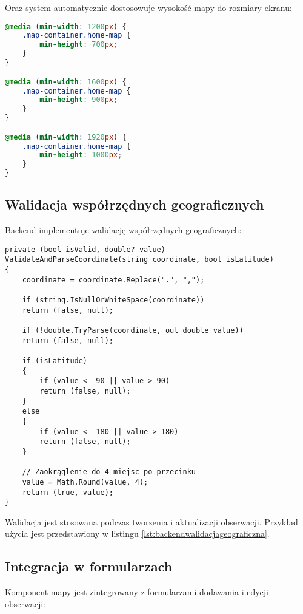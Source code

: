 Oraz system automatycznie dostosowuje wysokość mapy do rozmiary ekranu:

\begin{lstlisting}[language=CSS, caption={Styl CSS mapy do wysokości}]
@media (min-width: 1200px) {
	.map-container.home-map {
		min-height: 700px;
	}
}

@media (min-width: 1600px) {
	.map-container.home-map {
		min-height: 900px;
	}
}

@media (min-width: 1920px) {
	.map-container.home-map {
		min-height: 1000px;
	}
}
\end{lstlisting}

\subsection{Walidacja współrzędnych geograficznych}
Backend implementuje walidację współrzędnych geograficznych:

\begin{lstlisting}[style=csharp, caption={Kod odpowiedzialny za walidacje współrzędnych}]
private (bool isValid, double? value) ValidateAndParseCoordinate(string coordinate, bool isLatitude)
{
	coordinate = coordinate.Replace(".", ",");
	
	if (string.IsNullOrWhiteSpace(coordinate))
	return (false, null);
	
	if (!double.TryParse(coordinate, out double value))
	return (false, null);
	
	if (isLatitude)
	{
		if (value < -90 || value > 90)
		return (false, null);
	}
	else
	{
		if (value < -180 || value > 180)
		return (false, null);
	}
	
	// Zaokrąglenie do 4 miejsc po przecinku
	value = Math.Round(value, 4);
	return (true, value);
}
\end{lstlisting}

Walidacja jest stosowana podczas tworzenia i aktualizacji obserwacji. Przykład użycia jest przedstawiony w listingu \ref{lst:backendwalidacjageograficzna}.

\subsection{Integracja w formularzach}

Komponent mapy jest zintegrowany z formularzami dodawania i edycji obserwacji:

